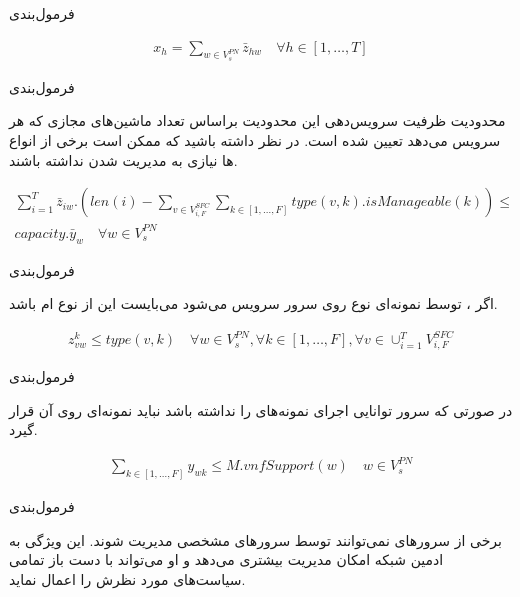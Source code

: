 \documentclass{beamer}
\begin{document}
\begin{persian}
\begin{frame}{فرمول‌بندی}
\begin{latin}
\begin{align}
        x_h = \sum_{w \in V_{s}^{PN}} \bar{z}_{hw}
        \quad
        \forall h \in [1,\ldots, T]
    \end{align}\end{latin}
\end{frame}
\begin{frame}{فرمول‌بندی}
    \par
    محدودیت ظرفیت سرویس‌دهی 
    این محدودیت براساس تعداد ماشین‌های مجازی که هر
    سرویس می‌دهد تعیین شده است.
    در نظر داشته باشید که ممکن است برخی از انواع
    ‌ها
    نیازی به مدیریت شدن نداشته باشند.

    \begin{latin}
        \begin{align}
            \sum_{i=1}^{T} \bar{z}_{iw} . (len(i) - \sum_{v \in V_{i, F}^{SFC}} \sum_{k \in [1, \dots, F]} type(v, k) . isManageable(k)) \le \nonumber \\
            capacity . \bar{y}_{w}
            \quad
            \forall w \in V_{s}^{PN}
        \end{align}
    \end{latin}
\end{frame}
\begin{frame}{فرمول‌بندی}
    \par
    اگر ، 
    توسط نمونه‌ای نوع 
    روی سرور  سرویس می‌شود می‌بایست
    این  از نوع ام باشد.
    \begin{latin}\begin{align}
        z_{vw}^{k} \le type(v, k)
        \quad
        \forall w \in V_{s}^{PN},
        \forall k \in [1,\ldots, F],
        \forall v \in \cup_{i=1}^T V_{i, F}^{SFC}
    \end{align}\end{latin}
\end{frame}
\begin{frame}{فرمول‌بندی}
    \par
    در صورتی که سرور 
    توانایی اجرای نمونه‌های 
    را نداشته باشد نباید نمونه‌ای روی آن قرار گیرد.

    \begin{latin}
        \begin{align}
            \sum_{k \in [1, \dots, F]} y_{wk} \le M . vnfSupport(w)
            \quad
            w \in V_{s}^{PN}
        \end{align}
    \end{latin}
\end{frame}
\begin{frame}{فرمول‌بندی}
    \par
    برخی از سرورهای نمی‌توانند توسط سرورهای مشخصی مدیریت شوند.
    این ویژگی به ادمین شبکه امکان مدیریت بیشتری می‌دهد و او می‌تواند با دست باز تمامی
    سیاست‌های مورد نظرش را اعمال نماید.


\end{frame}
\end{persian}
\end{document}
